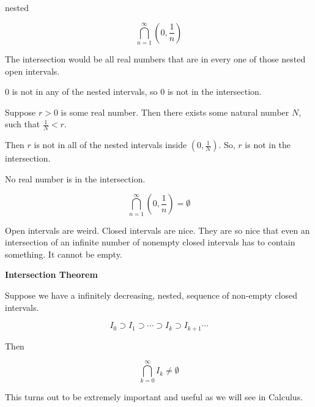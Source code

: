 \documentclass{ximera}
\begin{document}
\begin{example} nested


\[ \bigcap_{n=1}^{\infty}   \left(0,  \frac{1}{n}\right)     \]



The intersection would be all real numbers that are in every one of those nested open intervals.


$0$ is not in any of the nested intervals, so $0$ is not in the intersection.


Suppose $r>0$ is some real number.  Then there exists some natural number $N$, such that $\frac{1}{N} < r$.

Then $r$ is not in all of the nested intervals inside $\left(0,  \frac{1}{N}\right)$. So, $r$ is not in the intersection.


No real number is in the intersection.


\[ \bigcap_{n=1}^{\infty}   \left(0,  \frac{1}{n}\right)  = \emptyset    \]



\end{example}










Open intervals are weird.  Closed intervals are nice.  They are so nice that even an intersection of an infinite number of nonempty closed intervals has to contain something.  It cannot be empty.




\begin{theorem} \textbf{\textcolor{-red!75!green}{Intersection Theorem}}  


Suppose we have a infinitely decreasing, nested, sequence of non-empty closed intervals.


\[   I_0 \supset    I_1 \supset  \cdots \supset I_{k}   \supset I_{k+1}  \cdots  \]



Then 


\[   \bigcap_{k=0}^{\infty} I_{k} \ne \emptyset         \]


\end{theorem}













This turns out to be extremely important and useful as we will see in Calculus.
\end{document}
